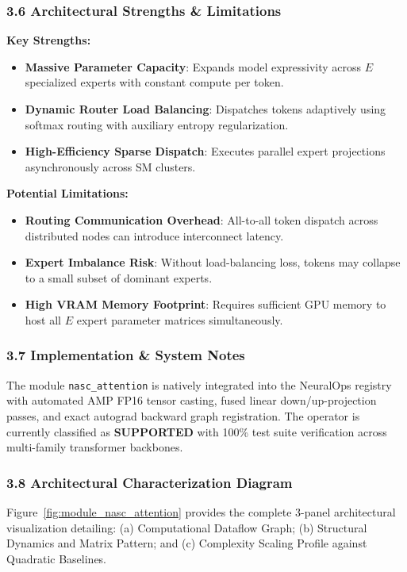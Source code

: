 \subsubsection*{3.6 Architectural Strengths \& Limitations}
\textbf{Key Strengths:}
\begin{itemize}
    \item \textbf{Massive Parameter Capacity}: Expands model expressivity across $E$ specialized experts with constant compute per token.
    \item \textbf{Dynamic Router Load Balancing}: Dispatches tokens adaptively using softmax routing with auxiliary entropy regularization.
    \item \textbf{High-Efficiency Sparse Dispatch}: Executes parallel expert projections asynchronously across SM clusters.
\end{itemize}

\textbf{Potential Limitations:}
\begin{itemize}
    \item \textbf{Routing Communication Overhead}: All-to-all token dispatch across distributed nodes can introduce interconnect latency.
    \item \textbf{Expert Imbalance Risk}: Without load-balancing loss, tokens may collapse to a small subset of dominant experts.
    \item \textbf{High VRAM Memory Footprint}: Requires sufficient GPU memory to host all $E$ expert parameter matrices simultaneously.
\end{itemize}

\subsubsection*{3.7 Implementation \& System Notes}
The module \texttt{nasc\_attention} is natively integrated into the NeuralOps registry with automated AMP FP16 tensor casting, fused linear down/up-projection passes, and exact autograd backward graph registration. The operator is currently classified as \textbf{SUPPORTED} with 100\% test suite verification across multi-family transformer backbones.

\subsubsection*{3.8 Architectural Characterization Diagram}
Figure~\ref{fig:module_nasc_attention} provides the complete 3-panel architectural visualization detailing: (a) Computational Dataflow Graph; (b) Structural Dynamics and Matrix Pattern; and (c) Complexity Scaling Profile against Quadratic Baselines.

